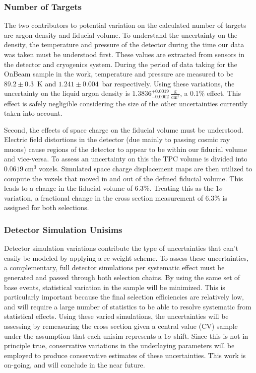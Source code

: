 \subsubsection{Number of Targets}\label{sec:ntarguncert}
The two contributors to potential variation on the calculated number of targets are argon density and fiducial volume. To understand the uncertainty on the density, the temperature and pressure of the detector during the time our data was taken must be understood first. These values are extracted from sensors in the detector and cryogenics system. During the period of data taking for the OnBeam sample in the work, temperature and pressure are measured to be $89.2 \pm 0.3$~K and $1.241 \pm 0.004$~bar respectively. Using these variations, the uncertainty on the liquid argon density is $1.3836^{+0.0019}_{-0.0002}~\frac{\text{g}}{\text{cm}^3}$, a 0.1\% effect. This effect is safely negligible considering the size of the other uncertainties currently taken into account.
\par Second, the effects of space charge on the fiducial volume must be understood. Electric field distortions in the detector (due mainly to passing cosmic ray muons) cause regions of the detector to appear to be within our fiducial volume and vice-versa. To assess an uncertainty on this the TPC volume is divided into $0.0619~\text{cm}^3$ voxels. Simulated space charge displacement maps are then utilized to compute the voxels that moved in and out of the defined fiducial volume. This leads to a change in the fiducial volume of 6.3\%. Treating this as the 1$\sigma$ variation, a fractional change in the cross section measurement of 6.3\% is assigned for both selections. 

\subsubsection{Detector Simulation Unisims}
Detector simulation variations contribute the type of uncertainties that can't easily be modeled by applying a re-weight scheme. To assess these uncertainties, a complementary, full detector simulations per systematic effect must be generated and passed through both selection chains. By using the same set of base events, statistical variation in the sample will be minimized. This is particularly important because the final selection efficiencies are relatively low, and will require a large number of statistics to be able to resolve systematic from statistical effects.  Using these varied simulations, the uncertainties will be assessing by remeasuring the cross section given a central value (CV) sample under the assumption that each unisim represents a 1$\sigma$ shift. Since this is not in principle true, conservative variations in the underlaying parameters will be employed to produce conservative estimates of these uncertainties. This work is on-going, and will conclude in the near future. 

